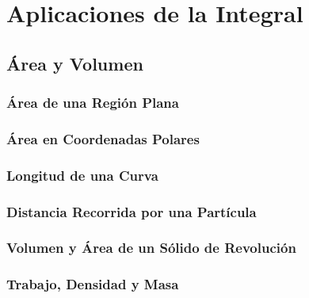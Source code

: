 \part{Aplicaciones de la Integral} %
\label{prt:aplicaciones_ _de_ _la_ _integral_}
	\chapter{Área y Volumen} %
	\label{cha:área_y_volumen}
		\section{Área de una Región Plana} %
		\label{sec:área_de_una_región_plana}
			
		\section{Área en Coordenadas Polares} %
		\label{sec:área_en_coordenadas_polares}
			
		\section{Longitud de una Curva} %
		\label{sec:longitud_de_una_curva}
			
		\section{Distancia Recorrida por una Partícula} %
		\label{sec:distancia_recorrida_por_una_partícula}
			
		\section{Volumen y Área de un Sólido de Revolución} %
		\label{sec:volumen_y_área_de_un_sólido_de_revolución}
			
		\section{Trabajo, Densidad y Masa} %
		\label{sec:trabajo_densidad_y_masa}
			
